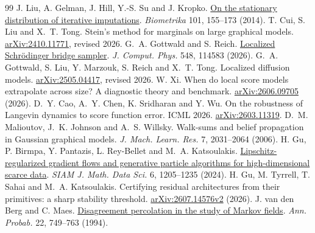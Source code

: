 \documentclass[12pt,a4paper]{article}
\begin{document}
\begin{thebibliography}{99}
 J. Liu, A. Gelman, J. Hill, Y.-S. Su and J. Kropko. \href{https://doi.org/10.1093/biomet/ast044}{On the stationary distribution of iterative imputations}. \emph{Biometrika} 101, 155--173 (2014).
 T. Cui, S. Liu and X.~T. Tong. Stein's method for marginals on large graphical models. \href{https://arxiv.org/abs/2410.11771}{arXiv:2410.11771}, revised 2026.
 G.~A. Gottwald and S. Reich. \href{https://doi.org/10.1016/j.jcp.2025.114583}{Localized Schr\"odinger bridge sampler}. \emph{J. Comput. Phys.} 548, 114583 (2026).
 G.~A. Gottwald, S. Liu, Y. Marzouk, S. Reich and X.~T. Tong. Localized diffusion models. \href{https://arxiv.org/abs/2505.04417}{arXiv:2505.04417}, revised 2026.
 W. Xi. When do local score models extrapolate across size? A diagnostic theory and benchmark. \href{https://arxiv.org/abs/2606.09705}{arXiv:2606.09705} (2026).
 D.~Y. Cao, A.~Y. Chen, K. Sridharan and Y. Wu. On the robustness of Langevin dynamics to score function error. ICML 2026. \href{https://arxiv.org/abs/2603.11319}{arXiv:2603.11319}.
 D.~M. Malioutov, J.~K. Johnson and A.~S. Willsky. Walk-sums and belief propagation in Gaussian graphical models. \emph{J. Mach. Learn. Res.} 7, 2031--2064 (2006).
 H. Gu, P. Birmpa, Y. Pantazis, L. Rey-Bellet and M.~A. Katsoulakis. \href{https://doi.org/10.1137/23M1587841}{Lipschitz-regularized gradient flows and generative particle algorithms for high-dimensional scarce data}. \emph{SIAM J. Math. Data Sci.} 6, 1205--1235 (2024).
 H. Gu, M. Tyrrell, T. Sahai and M.~A. Katsoulakis. Certifying residual architectures from their primitives: a sharp stability threshold. \href{https://arxiv.org/abs/2607.14576}{arXiv:2607.14576v2} (2026).
 J. van den Berg and C. Maes. \href{https://doi.org/10.1214/aop/1176988728}{Disagreement percolation in the study of Markov fields}. \emph{Ann. Probab.} 22, 749--763 (1994).
\end{thebibliography}
\endgroup
\end{document}
